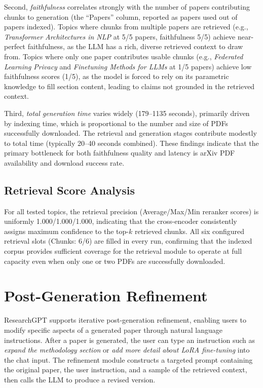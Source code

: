\documentclass[12pt, a4paper]{article}
\begin{document}
Second, \textit{faithfulness} correlates strongly with the number of papers
contributing chunks to generation (the ``Papers'' column, reported as papers used
out of papers indexed). Topics where chunks from multiple papers are retrieved
(e.g., \textit{Transformer Architectures in NLP} at 5/5 papers, faithfulness 5/5)
achieve near-perfect faithfulness, as the LLM has a rich, diverse retrieved context
to draw from. Topics where only one paper contributes usable chunks
(e.g., \textit{Federated Learning Privacy} and \textit{Finetuning Methods for
LLMs} at 1/5 papers) achieve low faithfulness scores (1/5), as the model is
forced to rely on its parametric knowledge to fill section content, leading to
claims not grounded in the retrieved context.

Third, \textit{total generation time} varies widely (179--1135 seconds), primarily
driven by indexing time, which is proportional to the number and size of PDFs
successfully downloaded. The retrieval and generation stages contribute modestly to
total time (typically 20--40 seconds combined). These findings indicate that the
primary bottleneck for both faithfulness quality and latency is arXiv PDF
availability and download success rate.

\subsection{Retrieval Score Analysis}

For all tested topics, the retrieval precision (Average/Max/Min reranker scores)
is uniformly 1.000/1.000/1.000, indicating that the cross-encoder consistently
assigns maximum confidence to the top-$k$ retrieved chunks. All six configured
retrieval slots (Chunks: 6/6) are filled in every run, confirming that the indexed
corpus provides sufficient coverage for the retrieval module to operate at full
capacity even when only one or two PDFs are successfully downloaded.

\section{Post-Generation Refinement}

ResearchGPT supports iterative post-generation refinement, enabling users to
modify specific aspects of a generated paper through natural language instructions.
After a paper is generated, the user can type an instruction such as \textit{expand
the methodology section} or \textit{add more detail about LoRA fine-tuning} into
the chat input. The refinement module constructs a targeted prompt containing the
original paper, the user instruction, and a sample of the retrieved context, then
calls the LLM to produce a revised version.
\end{document}
